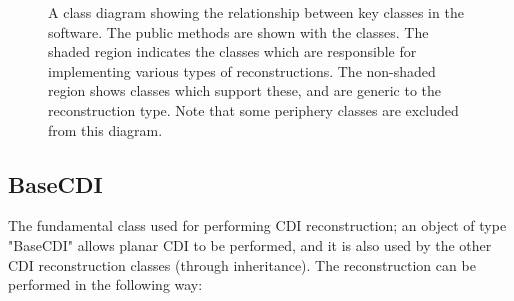 \documentclass[]{nadia}
\def\name{NADIA}
\begin{document}
\begin{center}
\begin{figure}
    \caption[]{A class diagram showing the relationship between key classes in the software. The public methods are shown with the  classes. The shaded region indicates the classes which are responsible for implementing various types of reconstructions. The non-shaded region shows classes which support these, and are generic to the reconstruction type. Note that some periphery classes are excluded from this diagram.\label{fig:class_diagram}}
  \end{figure}
\end{center}


\subsection{BaseCDI}
The fundamental class used for performing CDI reconstruction; an
object of type "BaseCDI" allows planar CDI to be performed, and it is
also used by the other CDI reconstruction classes (through inheritance).
The reconstruction can be performed in the following way:
\end{document}
